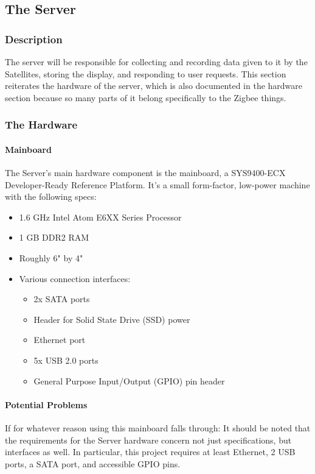 \subsection{The Server}

\subsubsection{Description}

The server will be responsible for collecting and recording data given to it by the Satellites, storing the display, and responding to user requests. 
This section reiterates the hardware of the server, which is also documented in the hardware section because so many parts of it belong specifically to the Zigbee things.

\subsubsection{The Hardware}

\paragraph{Mainboard}
The Server's main hardware component is the mainboard, a SYS9400-ECX Developer-Ready Reference Platform. 
It's a small form-factor, low-power machine with the following specs:

\begin{itemize}
	\item 1.6 GHz Intel Atom E6XX Series Processor
	\item 1 GB DDR2 RAM
	\item Roughly 6" by 4"
	\item Various connection interfaces:
	\begin{itemize}
		\item 2x SATA ports
		\item Header for Solid State Drive (SSD) power
		\item Ethernet port
		\item 5x USB 2.0 ports
		\item General Purpose Input/Output (GPIO) pin header
	\end{itemize}
\end{itemize}

\paragraph{Potential Problems}
If for whatever reason using this mainboard falls through: 
It should be noted that the requirements for the Server hardware concern not just specifications, but interfaces as well.
In particular, this project requires at least Ethernet, 2 USB ports, a SATA port, and accessible GPIO pins.

